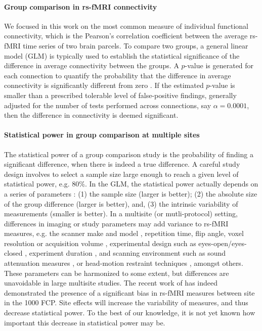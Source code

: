 \documentclass[authoryear]{elsarticle}
\begin{document}
\paragraph{Group comparison in rs-fMRI connectivity}
We focused in this work on the most common measure of individual functional connectivity, which is the Pearson's correlation coefficient between the average rs-fMRI time series of two brain parcels. To compare two groups, a general linear model (GLM) is typically used to establish the statistical significance of the difference in average connectivity between the groups. A $p$-value is generated for each connection to quantify the probability that the difference in average connectivity is significantly different from zero \citep{Worsley1995}. If the estimated $p$-value is smaller than a prescribed tolerable level of false-positive findings, generally adjusted for the number of tests performed across connections, say $\alpha=0.0001$, then the difference in connectivity is deemed significant. 

\paragraph{Statistical power in group comparison at multiple sites}
The statistical power of a group comparison study is the probability of finding a significant difference, when there is indeed a true difference. A careful study design involves to select a sample size large enough to reach a given level of statistical power, e.g. 80\%. In the GLM, the statistical power actually depends on a series of parameters \citep{Desmond2002}: (1) the sample size (larger is better); (2) the absolute size of the group difference (larger is better), and, (3) the intrinsic variability of measurements (smaller is better). 
In a multisite (or mutli-protocol) setting, differences in imaging or study parameters may add variance to rs-fMRI measures, e.g. the scanner make and model \citep{Friedman2006}, repetition time, flip angle, voxel resolution or acquisition volume \citep{Friedman2006a}, experimental design such as eyes-open/eyes-closed \citep{Yan2009}, experiment duration \citep{VanDijk2010}, and scanning environment such as sound attenuation measures \citep{Elliott1999}, or head-motion restraint techniques \citep{Edward2000}, amongst others. These parameters can be harmonized to some extent, but differences are unavoidable in large multisite studies. The recent work of \cite{Yan2013h} has indeed demonstrated the presence of a significant bias in rs-fMRI measures between site in the 1000 FCP. Site effects will increase the variability of measures, and thus decrease statistical power. To the best of our knowledge, it is not yet known how important this decrease in statistical power may be. 
\end{document}
